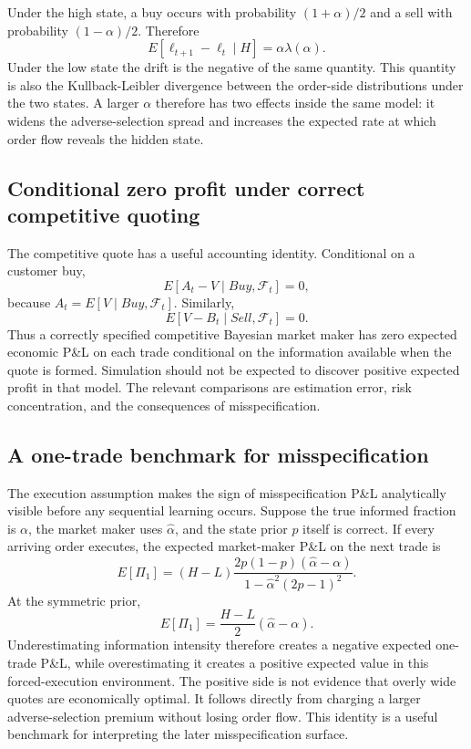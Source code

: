 \documentclass[11pt]{article}
\begin{document}
Under the high state, a buy occurs with probability $(1+\alpha)/2$ and a sell with probability $(1-\alpha)/2$. Therefore
\begin{equation}
E[\ell_{t+1}-\ell_t\mid H]
=\alpha\lambda(\alpha).
\end{equation}
Under the low state the drift is the negative of the same quantity. This quantity is also the Kullback-Leibler divergence between the order-side distributions under the two states. A larger $\alpha$ therefore has two effects inside the same model: it widens the adverse-selection spread and increases the expected rate at which order flow reveals the hidden state.

\subsection{Conditional zero profit under correct competitive quoting}

The competitive quote has a useful accounting identity. Conditional on a customer buy,
\begin{equation}
E[A_t-V\mid Buy,\mathcal{F}_t]=0,
\end{equation}
because $A_t=E[V\mid Buy,\mathcal{F}_t]$. Similarly,
\begin{equation}
E[V-B_t\mid Sell,\mathcal{F}_t]=0.
\end{equation}
Thus a correctly specified competitive Bayesian market maker has zero expected economic P\&L on each trade conditional on the information available when the quote is formed. Simulation should not be expected to discover positive expected profit in that model. The relevant comparisons are estimation error, risk concentration, and the consequences of misspecification.

\subsection{A one-trade benchmark for misspecification}

The execution assumption makes the sign of misspecification P\&L analytically visible before any sequential learning occurs. Suppose the true informed fraction is $\alpha$, the market maker uses $\widehat{\alpha}$, and the state prior $p$ itself is correct. If every arriving order executes, the expected market-maker P\&L on the next trade is
\begin{equation}
E[\Pi_1]
=(H-L)\frac{2p(1-p)(\widehat{\alpha}-\alpha)}{1-\widehat{\alpha}^{2}(2p-1)^2}.
\end{equation}
At the symmetric prior,
\begin{equation}
\boxed{
E[\Pi_1]=\frac{H-L}{2}(\widehat{\alpha}-\alpha)
}.
\end{equation}
Underestimating information intensity therefore creates a negative expected one-trade P\&L, while overestimating it creates a positive expected value in this forced-execution environment. The positive side is not evidence that overly wide quotes are economically optimal. It follows directly from charging a larger adverse-selection premium without losing order flow. This identity is a useful benchmark for interpreting the later misspecification surface.
\end{document}

